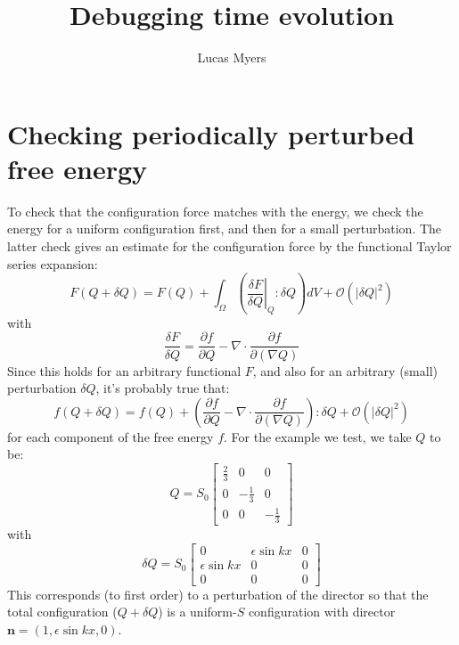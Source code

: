 \documentclass[reqno]{article}
\begin{document}
\title{Debugging time evolution}
\author{Lucas Myers}
\maketitle

\section{Checking periodically perturbed free energy}
To check that the configuration force matches with the energy, we check the energy for a uniform configuration first, and then for a small perturbation.
The latter check gives an estimate for the configuration force by the functional Taylor series expansion:
\begin{equation}
    F(Q + \delta Q)
    =
    F(Q)
    + \int_\Omega \left( \left. \frac{\delta F}{\delta Q} \right|_Q : \delta Q \right) dV 
    + \mathcal{O}\left(\left| \delta Q \right|^2 \right)
\end{equation}
with
\begin{equation}
    \frac{\delta F}{\delta Q}
    =
    \frac{\partial f}{\partial Q}
    - \nabla \cdot \frac{\partial f}{\partial \left( \nabla Q \right)}
\end{equation}
Since this holds for an arbitrary functional $F$, and also for an arbitrary (small) perturbation $\delta Q$, it's probably true that:
\begin{equation}
    f(Q + \delta Q)
    =
    f(Q)
    + \left( \frac{\partial f}{\partial Q} - \nabla \cdot \frac{\partial f}{\partial (\nabla Q)} \right) : \delta Q
    + \mathcal{O} \left( \left|\delta Q \right|^2 \right)
\end{equation}
for each component of the free energy $f$.
For the example we test, we take $Q$ to be:
\begin{equation}
    Q
    =
    S_0
    \begin{bmatrix}
        \tfrac23 &0 &0 \\
        0 &-\tfrac13 &0 \\
        0 &0 &-\tfrac13
    \end{bmatrix}
\end{equation}
with
\begin{equation}
    \delta Q
    =
    S_0
    \begin{bmatrix}
        0 &\epsilon \sin kx &0 \\
        \epsilon \sin kx &0 &0 \\
        0 &0 &0
    \end{bmatrix}
\end{equation}
This corresponds (to first order) to a perturbation of the director so that the total configuration ($Q + \delta Q$) is a uniform-$S$ configuration with director $\mathbf{n} = (1, \epsilon \sin kx, 0)$.
\end{document}
